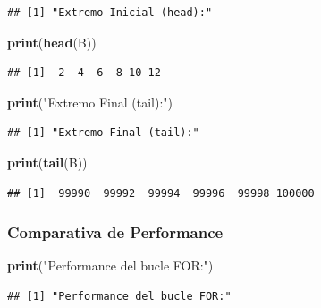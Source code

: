 \documentclass[]{llncs}
\newenvironment{Shaded}{\begin{snugshade}}{\end{snugshade}}
\newcommand{\FunctionTok}[1]{\textcolor[rgb]{0.13,0.29,0.53}{\textbf{#1}}}
\newcommand{\NormalTok}[1]{#1}
\newcommand{\StringTok}[1]{\textcolor[rgb]{0.31,0.60,0.02}{#1}}
\begin{document}
\begin{verbatim}
## [1] "Extremo Inicial (head):"
\end{verbatim}

\begin{Shaded}
\begin{Highlighting}[]
\FunctionTok{print}\NormalTok{(}\FunctionTok{head}\NormalTok{(B))}
\end{Highlighting}
\end{Shaded}

\begin{verbatim}
## [1]  2  4  6  8 10 12
\end{verbatim}

\begin{Shaded}
\begin{Highlighting}[]
\FunctionTok{print}\NormalTok{(}\StringTok{"Extremo Final (tail):"}\NormalTok{)}
\end{Highlighting}
\end{Shaded}

\begin{verbatim}
## [1] "Extremo Final (tail):"
\end{verbatim}

\begin{Shaded}
\begin{Highlighting}[]
\FunctionTok{print}\NormalTok{(}\FunctionTok{tail}\NormalTok{(B))}
\end{Highlighting}
\end{Shaded}

\begin{verbatim}
## [1]  99990  99992  99994  99996  99998 100000
\end{verbatim}

\subsubsection{Comparativa de
Performance}\label{comparativa-de-performance}

\begin{Shaded}
\begin{Highlighting}[]
\FunctionTok{print}\NormalTok{(}\StringTok{"Performance del bucle FOR:"}\NormalTok{)}
\end{Highlighting}
\end{Shaded}

\begin{verbatim}
## [1] "Performance del bucle FOR:"
\end{verbatim}
\end{document}
